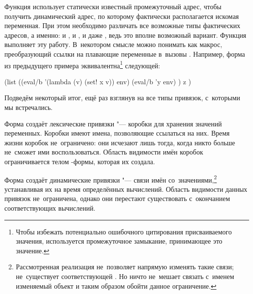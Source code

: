Функция  использует статически известный промежуточный
адрес, чтобы получить динамический адрес, по которому фактически располагается
искомая переменная. При этом необходимо различать все возможные типы фактических
адресов, а именно:  и ,  и
, и даже , ведь это вполне возможный вариант.
Функция  выполняет эту работу. В~некотором смысле
 можно понимать как макрос, преобразующий ссылки на плавающие
переменные в~вызовы . Например, форма  из предыдущего примера эквивалентна\footnote{Чтобы избежать
потенциально ошибочного цитирования присваиваемого значения, используется
промежуточное замыкание, принимающее это значение.} следующей:

\begin{code:lisp}
(list ((eval/b '(lambda (v) (set! x v)) env)
       (eval/b 'y env) )
      z )
\end{code:lisp}

Подведём некоторый итог, ещё раз взглянув на все типы привязок, с~которыми мы
встречались.

Форма  создаёт лексические привязки "--- коробки для хранения
значений переменных. Коробки имеют имена, позволяющие ссылаться на них. Время жизни
коробок не~ограничено: они исчезают лишь тогда, когда никто больше не~сможет
ими воспользоваться. Область видимости имён коробок ограничивается телом
-формы, которая их создала.

Форма  создаёт динамические привязки "--- связи имён
со~значениями,\footnote*{Рассмотренная реализация  не~позволяет
напрямую изменять такие связи; не~существует соответствующей .
Но ничто не~мешает связать с~именем изменяемый объект и таким образом обойти
данное ограничение.} устанавливая их на время определённых вычислений. Область
видимости данных привязок не~ограничена, однако они перестают существовать
с~окончанием соответствующих вычислений.

